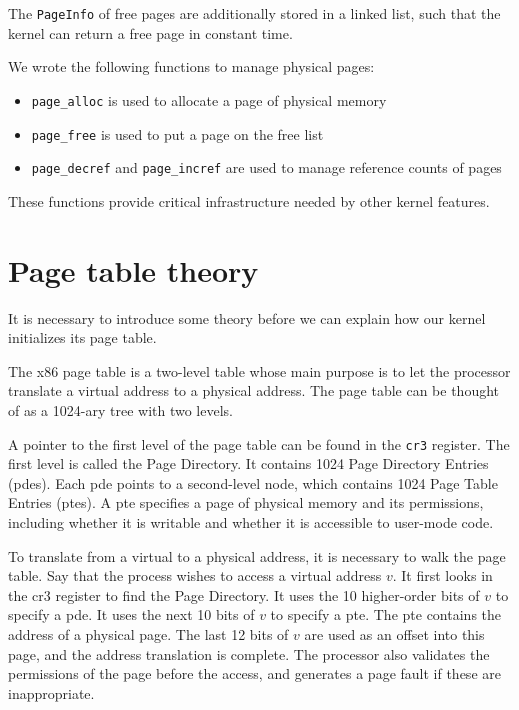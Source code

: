 \documentclass{report}
\begin{document}
The \texttt{PageInfo} of free pages are additionally stored in a linked list,
such that the kernel can return a free page in constant time.

We wrote the following functions to manage physical pages:
\begin{itemize}
\item \texttt{page\_alloc} is used to allocate a page of physical memory
\item \texttt{page\_free} is used to put a page on the free list
\item \texttt{page\_decref} and \texttt{page\_incref} are used to manage
reference counts of pages
\end{itemize}
These functions provide critical infrastructure needed by other kernel
features.



\section{Page table theory}
It is necessary to introduce some theory before we can explain how our kernel
initializes its page table.

The x86 page table is a two-level table whose main purpose is to let the
processor translate a virtual address to a physical address. The page table
can be thought of as a 1024-ary tree with two levels. 

A pointer to the first level of the page table can be found in the
\texttt{cr3} register. The first level is called the Page Directory. It
contains 1024 Page Directory Entries (\gls{pde}s). Each \gls{pde} points to a
second-level node, which contains 1024 Page Table Entries (\gls{pte}s). 
A \gls{pte} specifies a page of physical memory and its permissions, including
whether it is writable and whether it is accessible to user-mode code.

To translate from a virtual to a physical address, it is necessary to walk the
page table. Say that the process wishes to access a virtual address $v$. It
first looks in the \gls{cr3} register to find the Page Directory. It uses the
10 higher-order bits of $v$ to specify a \gls{pde}. It uses the next 10 bits
of $v$ to specify a \gls{pte}. The \gls{pte} contains the address of a
physical page. The last 12 bits of $v$ are used as an offset into this page,
and the address translation is complete. The processor also validates the
permissions of the page before the access, and generates a page fault if these
are inappropriate.
\end{document}
